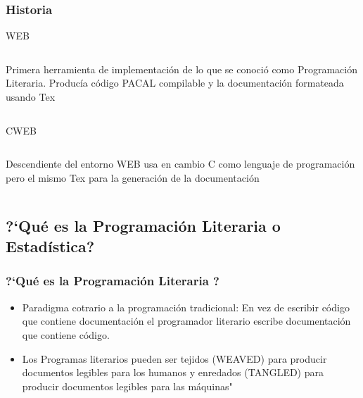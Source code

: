 \documentclass[sans serif,9pt,xcolor=dvipsnames]{beamer}%
\begin{document}
\begin{frame}
\frametitle{Historia}

\begin{block}{WEB}
\begin{columns}
\justifying
Primera herramienta de implementación de lo que se conoció como Programación Literaria. Producía código PACAL compilable y la documentación formateada usando Tex
\end{columns}
\end{block}

\begin{block}{CWEB}
\begin{columns}
\justifying
Descendiente del entorno WEB usa en cambio C como lenguaje de programación pero el mismo Tex para la generación de la documentación
\end{columns}
\end{block}
\end{frame}

\subsection{?`Qué es la Programación Literaria o Estadística?}
\begin{frame}
  \frametitle{?`Qué es la Programación Literaria ?}
\begin{itemize}
\justifying
\item Paradigma cotrario a la programación tradicional: En vez de escribir código que contiene documentación el programador literario escribe documentación que contiene código. 
\bigskip
\item Los Programas literarios pueden ser tejidos (WEAVED) para producir documentos legibles para los humanos y enredados (TANGLED) para producir documentos legibles para las máquinas"

\end{itemize}
\end{frame}
\end{document}
